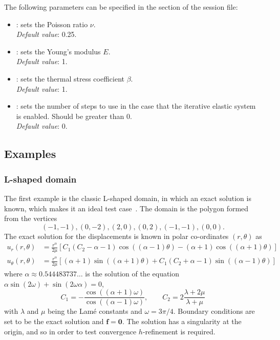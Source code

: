 The following parameters can be specified in the  section of
the session file:
\begin{itemize}
  \item {}: sets the Poisson ratio $\nu$.\\ 
  \textit{Default value}: 0.25.
  \item {}: sets the Young's modulus $E$.\\ 
  \textit{Default value}: 1.
  \item {}: sets the thermal stress coefficient $\beta$.\\ 
  \textit{Default value}: 1.
  \item {}: sets the number of steps to use in the case that the
  iterative elastic system is enabled. Should be greater than 0.\\ 
  \textit{Default value}: 0.
\end{itemize}

\subsection{Examples}

\subsubsection{L-shaped domain}

The first example is the classic L-shaped domain, in which an exact solution is
known, which makes it an ideal test case~\cite{Ko07}. The domain is the polygon
formed from the vertices
%
\[
(-1,-1), (0,-2), (2,0), (0,2), (-1,-1), (0,0).
\]
%
The exact solution for the displacements is known in polar co-ordinates
$(r,\theta)$ as
%
\begin{align*}
  u_r(r,\theta) &= \frac{r^\alpha}{2\mu} \left[
    C_1(C_2 - \alpha - 1)\cos((\alpha-1)\theta) - (\alpha+1)\cos((\alpha+1)\theta)
  \right]\\
  u_\theta(r,\theta) &= \frac{r^\alpha}{2\mu} \left[
    (\alpha+1)\sin((\alpha+1)\theta) + C_1(C_2+\alpha-1)\sin((\alpha-1)\theta)
  \right]
\end{align*}
%
where $\alpha\approx 0.544483737\dots$ is the solution of the equation
$\alpha\sin(2\omega) + \sin(2\omega\alpha) = 0$, 
%
\[
C_1 = -\frac{\cos((\alpha+1)\omega)}{\cos((\alpha-1)\omega)},\qquad
C_2 = 2\frac{\lambda + 2\mu}{\lambda+\mu}
\]
with $\lambda$ and $\mu$ being the Lam\'e constants and $\omega = 3\pi/4$.
Boundary conditions are set to be the exact solution and
$\mathbf{f} = \mathbf{0}$. The solution has a singularity at the origin, and so
in order to test convergence $h$-refinement is required.

